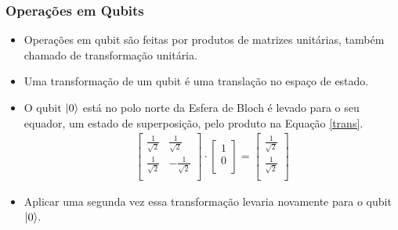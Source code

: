 \documentclass{beamer}
\DeclarePairedDelimiter\ket{\lvert}{\rangle}
\begin{document}
\begin{frame}
\frametitle{Operações em Qubits}
\begin{itemize}
  \item Operações em qubit são feitas por produtos de matrizes unitárias, também chamado
  de transformação unitária.
  \item Uma transformação de um qubit é uma translação no espaço de estado.
  \item O qubit $\ket{0}$ está no polo norte da Esfera de Bloch é
    levado para o seu equador, um estado de superposição, pelo produto
    na Equação \ref{trans}.
       \begin{align}
         \label{trans}
       \begin{bmatrix} 
                 \frac{1}{\sqrt{2}} & \frac{1}{\sqrt{2}}\\ 
                 \frac{1}{\sqrt{2}} & -\frac{1}{\sqrt{2}}\\ 
       \end{bmatrix}
         \cdot
       \begin{bmatrix} 
                 1 \\ 
                 0 \\ 
       \end{bmatrix}
         =
       \begin{bmatrix} 
                \frac{1}{\sqrt{2}} \\ 
                \frac{1}{\sqrt{2}} \\ 
       \end{bmatrix}
       \end{align}
  \item Aplicar uma segunda vez essa transformação levaria novamente para o qubit $\ket{0}$.
\end{itemize}
\end{frame}
\end{document}
